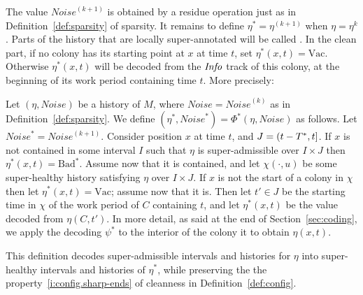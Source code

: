 \documentclass[11pt]{memoir}
\theoremstyle{definition} %
\renewcommand{\ge}{\geq}
\newcommand{\fld}[1]{\ensuremath{\textit{#1\/}}}
\def\B{B}
\newcommand{\Bad}{\mathrm{Bad}}
\newcommand{\Vacant}{\mathrm{Vac}}
\newcommand{\Noise}{\mathit{Noise}}
\newcommand{\Q}{Q}
\newcommand{\Tu}{T}
\newcommand{\Tus}{T^{*}}
\newcommand{\Info}{\fld{Info}}
\begin{document}
The value \( \Noise^{(k+1)} \) is obtained by a residue operation
just as in Definition~\ref{def:sparsity} of sparsity.
It remains to define \( \eta^{*}=\eta^{(k+1)} \) when \( \eta=\eta^{k} \).
Parts of the history that are locally super-annotated will be called .
In the clean part,
if no colony has its starting point at \( x \) at time \( t \), set \( \eta^{*}(x,t)=\Vacant \).
Otherwise \( \eta^{*}(x,t) \) will be decoded from
the \( \Info \) track of this colony, at the beginning of its work period 
containing time \( t \).
More precisely:

\begin{definition}[Scale-up]\label{def:scaleup}
Let \( (\eta,\Noise) \) be a history of \( M \), where \( \Noise=\Noise^{(k)} \)
as in Definition~\ref{def:sparsity}.
We define \( (\eta^{*},\Noise^{*})=\Phi^{*}(\eta,\Noise) \) as follows.
Let \( \Noise^{*}=\Noise^{(k+1)} \).
Consider position \( x \) at time \( t \), and \( J=\rint{t-\Tus}{t} \).
If \( x \) is not contained in some interval \( I \) such that \( \eta \) is super-admissible over \( I\times J \)
then \( \eta^{*}(x,t)=\Bad^{*} \).
Assume now that it is contained, and let
\( \chi(\cdot,u) \) be some super-healthy history satisfying \( \eta \) over \( I\times J \).
If \( x \) is not the start of a colony in \( \chi \) then let \( \eta^{*}(x,t)=\Vacant \); assume now that it is.
Then let \( t'\in J \) be the starting time in \( \chi \) of the work period of \( C \)
containing \( t \), and let \( \eta^{*}(x,t) \) be the value decoded from \( \eta(C,t') \).
In more detail, as said at the end of Section~\ref{sec:coding}, we apply the decoding
\( \psi^{*} \) to the interior of the colony it to obtain \( \eta(x,t) \).
\end{definition}

This definition decodes super-admissible intervals and histories for \( \eta \) into super-healthy
intervals and histories of \( \eta^{*} \), while preserving the the
property~\eqref{i:config.sharp-ends} of cleanness in Definition~\ref{def:config}.


\end{document}
